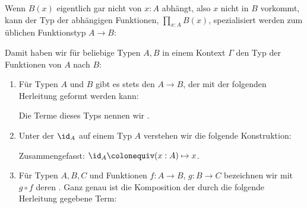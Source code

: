 Wenn $B(x)$ eigentlich gar nicht von $x:A$ abhängt, also $x$ nicht in $B$ vorkommt,
kann der Typ der abhängigen Funktionen, $\prod_{x:A}B(x)$, spezialisiert werden zum üblichen Funktionstyp $A\to B$:

Damit haben wir für beliebige Typen $A,B$ in einem Kontext $\Gamma$ den Typ der Funktionen von $A$ nach $B$:

\begin{definition}
  \begin{enumerate}
  \item Für Typen $A$ und $B$ gibt es stets den  $A\to B$, der mit der folgenden Herleitung geformt werden kann:
    \begin{mathpar}
    \end{mathpar}
    Die Terme dieses Typs nennen wir .
  \item Unter der  $\id_A$ auf einem Typ $A$ verstehen wir die folgende Konstruktion:
    \begin{mathpar}
    \end{mathpar}
    Zusammengefasst: $\id_A\colonequiv (x : A)\mapsto x$.
  \item Für Typen $A,B,C$ und Funktionen $f:A\to B$, $g:B\to C$ bezeichnen wir mit $g\circ f$ deren \index{$\circ$}.
    Ganz genau ist die Komposition der durch die folgende Herleitung gegebene Term:
\end{enumerate}
\end{definition}
